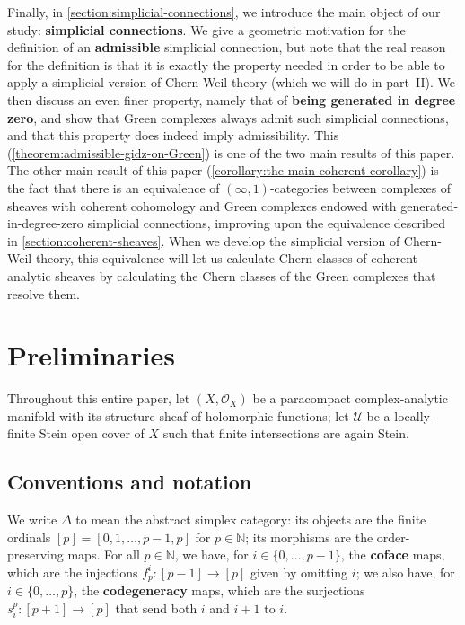 \documentclass[11pt,fleqn]{article}
\theoremstyle{plain}
\theoremstyle{definition}
\theoremstyle{remark}
\numberwithin{equation}{theorem}
\newcommand{\cover}{\mathcal{U}}
\newcommand{\OO}{\mathcal{O}}
\newcommand{\define}[1]{\textbf{#1}}
\begin{document}
    Finally, in \cref{section:simplicial-connections}, we introduce the main object of our study: \define{simplicial connections}.
    We give a geometric motivation for the definition of an \define{admissible} simplicial connection, but note that the real reason for the definition is that it is exactly the property needed in order to be able to apply a simplicial version of Chern-Weil theory (which we will do in part~II).
    We then discuss an even finer property, namely that of \define{being generated in degree zero}, and show that Gre{}en complexes always admit such simplicial connections, and that this property does indeed imply admissibility.
    This (\cref{theorem:admissible-gidz-on-Green}) is one of the two main results of this paper.
    The other main result of this paper (\cref{corollary:the-main-coherent-corollary}) is the fact that there is an equivalence of $(\infty,1)$-categories between complexes of sheaves with coherent cohomology and Green complexes endowed with generated-in-degree-zero simplicial connections, improving upon the equivalence described in \cref{section:coherent-sheaves}.
    When we develop the simplicial version of Chern-Weil theory, this equivalence will let us calculate Chern classes of coherent analytic sheaves by calculating the Chern classes of the Gre{}en complexes that resolve them.



\section{Preliminaries}\label{section:preliminaries}

    Throughout this entire paper, let $(X,\OO_X)$ be a paracompact complex-analytic manifold with its structure sheaf of holomorphic functions; let $\cover$ be a locally-finite Stein open cover of $X$ such that finite intersections are again Stein.


    \subsection{Conventions and notation}

        We write $\Delta$ to mean the abstract simplex category: its objects are the finite ordinals $[p]=[0,1,\ldots,p-1,p]$ for $p\in\mathbb{N}$; its morphisms are the order-preserving maps.
        For all $p\in\mathbb{N}$, we have, for $i\in\{0,\ldots,p-1\}$, the \define{coface} maps, which are the injections $f_p^i\colon[p-1]\to[p]$ given by omitting $i$; we also have, for $i\in\{0,\ldots,p\}$, the \define{codegeneracy} maps, which are the surjections $s_i^p\colon[p+1]\to[p]$ that send both $i$ and $i+1$ to $i$.
\end{document}
